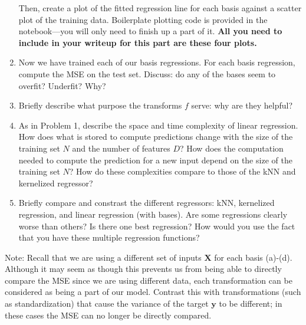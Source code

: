 \documentclass[submit]{../harvardml}
\begin{document}
\begin{problem}
\begin{enumerate}
        Then, create a plot of the fitted
        regression line for each basis against a scatter plot
        of the training data. Boilerplate plotting code is provided in the
        notebook---you will only need to finish up a part of it.
        \textbf{All you need to include
          in your writeup for this part are these four plots.}

        \item
          Now we have trained each of our basis regressions. For each basis
          regression, compute the MSE on the test set.  Discuss: do any of the
          bases seem to overfit?  Underfit?  Why?


    \item Briefly describe what purpose the transforms $f$ serve: why are they helpful?

    \item As in Problem 1, describe the space and time complexity of linear regression.  How does what is stored to compute predictions change with the size of the training set $N$ and the number of features $D$?  How does the computation needed to compute the prediction for a new input depend on the size of the training set $N$?  How do these complexities compare to those of the kNN and kernelized regressor?

    \item Briefly compare and constrast the different regressors: kNN,
          kernelized regression, and linear regression (with bases).  Are some
          regressions clearly worse than others?  Is there one best
          regression?  How would you use the fact that you have these multiple
          regression functions?

  \end{enumerate}
  Note:
  Recall that we are using a
  different set of inputs $\mathbf{X}$ for each basis (a)-(d).
  Although it may seem as though this prevents us from being able
  to directly compare the MSE since we are using different data,
  each transformation can be considered as being a part of our model.
  Contrast this with transformations (such as standardization) that cause the variance of the target $\mathbf{y}$ to be different; in these cases the
  MSE can no longer be directly compared.
\end{problem}
\end{document}
